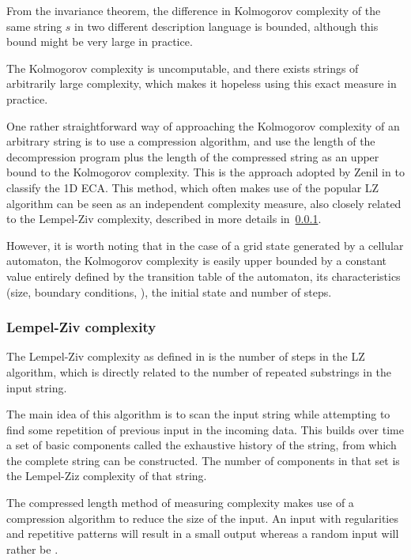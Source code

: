 From the invariance theorem, the difference in Kolmogorov complexity of the same
string $s$ in two different description language is bounded, although this bound
might be very large in practice.

The Kolmogorov complexity is uncomputable, and there exists strings of
arbitrarily large complexity, which makes it hopeless using this exact measure
in practice.

One rather straightforward way of approaching the Kolmogorov complexity of an
arbitrary string is to use a compression algorithm, and use the length of the
decompression program plus the length of the compressed string as an upper bound
to the Kolmogorov complexity. This is the approach adopted by Zenil in
\parencite{zenilCompressionBasedInvestigationDynamical2010} to classify the 1D ECA. This method, which
often makes use of the popular LZ algorithm can be seen as an independent
complexity measure, also closely related to the Lempel-Ziv complexity, described
in more details in~\ref{subsection:lempel-ziv}.

However, it is worth noting that in the case of a grid state generated by a
cellular automaton, the Kolmogorov complexity is easily upper bounded by a
constant value entirely defined by the transition table of the automaton, its
characteristics (size, boundary conditions, \etc), the initial state and number
of steps.

\subsubsection{Lempel-Ziv complexity}\label{subsection:lempel-ziv}
The Lempel-Ziv complexity as defined in \parencite{lempelComplexityFiniteSequences1976} is the
number of steps in the LZ algorithm, which is directly related to the number of
repeated substrings in the input string.

The main idea of this algorithm is to scan the input string while attempting to
find some repetition of previous input in the incoming data. This builds over
time a set of basic components called the exhaustive history of the string, from
which the complete string can be constructed. The number of components in that
set is the Lempel-Ziz complexity of that string.

The compressed length method of measuring complexity makes use of a compression
algorithm to reduce the size of the input. An input with regularities and
repetitive patterns will result in a small output whereas a random input will
rather be .

